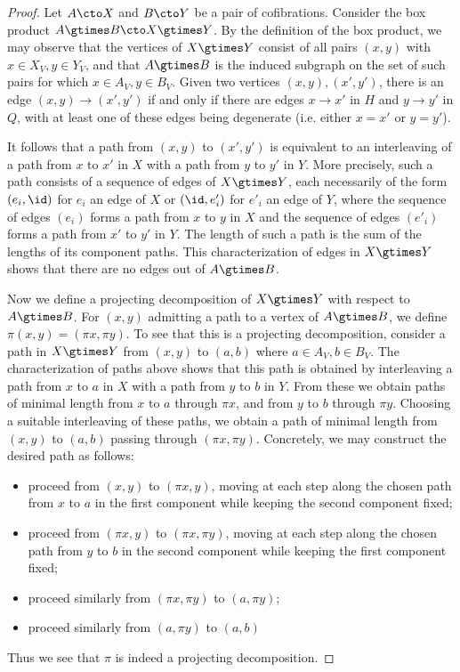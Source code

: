 \begin{proof}
Let $A \cto X$ and $B \cto Y$ be a pair of cofibrations. Consider the box product $A \gtimes B \cto X \gtimes Y$. By the definition of the box product, we may observe that the vertices of $X \gtimes Y$ consist of all pairs $(x,y)$ with $x \in X_V, y \in Y_V$, and that $A \gtimes B$ is the induced subgraph on the set of such pairs for which $x \in A_V, y \in B_V$. Given two vertices $(x,y), (x',y')$, there is an edge $(x,y) \to (x',y')$ if and only if there are edges $x \to x'$ in $H$ and $y \to y'$ in $Q$, with at least one of these edges being degenerate (i.e.  either $x = x'$ or $y = y'$). 

It follows that a path from $(x,y)$ to $(x',y')$ is equivalent to an interleaving of a path from $x$ to $x'$ in $X$ with a path from $y$ to $y'$ in $Y$. More precisely, such a path consists of a sequence of edges of $X \gtimes Y$, each necessarily of the form $(e_i,\id)$ for $e_i$ an edge of $X$ or $(\id,e'_i)$ for $e'_i$ an edge of $Y$, where the sequence of edges $(e_i)$ forms a path from $x$ to $y$ in $X$ and the sequence of edges $(e'_i)$ forms a path from $x'$ to $y'$ in $Y$. The length of such a path is the sum of the lengths of its component paths. This characterization of edges in $X \gtimes Y$ shows that there are no edges out of $A \gtimes B$.

Now we define a projecting decomposition of $X \gtimes Y$ with respect to $A \gtimes B$. For $(x,y)$ admitting a path to a vertex of $A \gtimes B$, we define $\pi(x,y) = (\pi x, \pi y)$. To see that this is a projecting decomposition, consider a path in $X \gtimes Y$ from $(x,y)$ to $(a,b)$ where $a \in A_V, b \in B_V$. The characterization of paths above shows that this path is obtained by interleaving a path from $x$ to $a$ in $X$ with a path from $y$ to $b$ in $Y$. From these we obtain paths of minimal length from $x$ to $a$ through $\pi x$, and from $y$ to $b$ through $\pi y$. Choosing a suitable interleaving of these paths, we obtain a path of minimal length from $(x,y)$ to $(a,b)$ passing through $(\pi x, \pi y)$. Concretely, we may construct the desired path as follows:
\begin{itemize}
    \item proceed from $(x,y)$ to $(\pi x, y)$, moving at each step along the chosen path from $x$ to $a$ in the first component while keeping the second component fixed;
    \item proceed from $(\pi x, y)$ to $(\pi x, \pi y)$, moving at each step along the chosen path from $y$ to $b$ in the second component while keeping the first component fixed;
    \item proceed similarly from $(\pi x, \pi y)$ to $(a, \pi y)$;
    \item proceed similarly from $(a,\pi y)$ to $(a,b)$
\end{itemize}
Thus we see that $\pi$ is indeed a projecting decomposition.
\end{proof}

